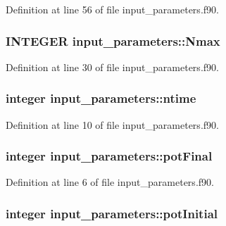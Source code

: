 Definition at line 56 of file input\_\-parameters.f90.

\hypertarget{namespaceinput__parameters_a29545f09a06c5a3def5df7fdb5f966ab}{
\subsubsection[{Nmax}]{\setlength{\rightskip}{0pt plus 5cm}INTEGER {\bf input\_\-parameters::Nmax}}}
\label{namespaceinput__parameters_a29545f09a06c5a3def5df7fdb5f966ab}


Definition at line 30 of file input\_\-parameters.f90.

\hypertarget{namespaceinput__parameters_a0c5bab2cbe910c8543c442cb9be582d0}{
\subsubsection[{ntime}]{\setlength{\rightskip}{0pt plus 5cm}integer {\bf input\_\-parameters::ntime}}}
\label{namespaceinput__parameters_a0c5bab2cbe910c8543c442cb9be582d0}


Definition at line 10 of file input\_\-parameters.f90.

\hypertarget{namespaceinput__parameters_a2ccc9d711d290b3e33fbc675ed390af2}{
\subsubsection[{potFinal}]{\setlength{\rightskip}{0pt plus 5cm}integer {\bf input\_\-parameters::potFinal}}}
\label{namespaceinput__parameters_a2ccc9d711d290b3e33fbc675ed390af2}


Definition at line 6 of file input\_\-parameters.f90.

\hypertarget{namespaceinput__parameters_a27dbda031851f558814121445cf46ed9}{
\subsubsection[{potInitial}]{\setlength{\rightskip}{0pt plus 5cm}integer {\bf input\_\-parameters::potInitial}}}
\label{namespaceinput__parameters_a27dbda031851f558814121445cf46ed9}


